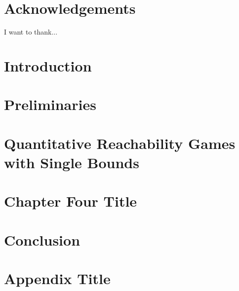 \documentclass[a4paper, 11pt, oneside]{book}
\theoremstyle{definition}
\begin{document}
\chapter*{Acknowledgements}
I want to thank...

\tableofcontents

\chapter{Introduction}

 
\chapter{Preliminaries}

 
\chapter{Quantitative Reachability Games with Single Bounds}

 
\chapter{Chapter Four Title}

 
\chapter{Conclusion}





\appendix
\chapter{Appendix Title}

\end{document}
